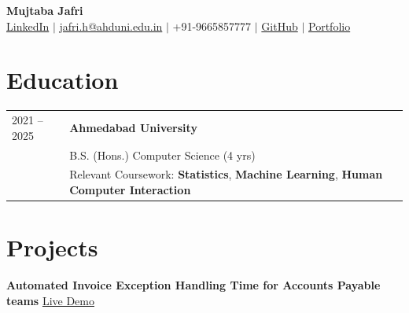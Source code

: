 \documentclass[a4paper,11pt]{article}
\begin{document}
\pagestyle{empty}


\begin{center}

{\LARGE\bfseries Mujtaba Jafri} \\[8pt]

\href{https://www.linkedin.com/in/mujtaba30/}{LinkedIn}
 $|$
\href{mailto:jafri.h@ahduni.edu.in}{jafri.h@ahduni.edu.in}
 $|$
+91-9665857777
 $|$
\href{https://github.com/MujtabaJ30}{GitHub}
 $|$
\href{https://portfolio-mujtabaj30.vercel.app/}{Portfolio}

\end{center}



\section{Education}

\begin{tabularx}{\linewidth}{@{}l X@{}}

2021 -- 2025 &
\textbf{Ahmedabad University} \\
&
B.S. (Hons.) Computer Science (4 yrs) \\

&
Relevant Coursework:
\textbf{Statistics},
\textbf{Machine Learning},
\textbf{Human Computer Interaction} \\

\end{tabularx}



\section{Projects}


\textbf{Automated Invoice Exception Handling Time for Accounts Payable teams}
\hfill
\href{https://github.com/MujtabaJ30/Invoice-exception-handler}{Live Demo}
\end{document}
